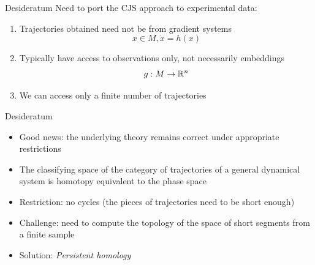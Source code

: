 \documentclass{beamer}
\begin{document}
\begin{frame}{Desideratum}
    Need to port the CJS approach to experimental data:
    \begin{enumerate}
        \item Trajectories obtained need not be from gradient systems
            \[ x \in M, \dot{x} = h(x) \]
            \pause
        \item Typically have access to observations only, not necessarily embeddings
            \[ g : M \rightarrow \mathbb{R}^n \]
            \pause
        \item We can access only a finite number of trajectories
    \end{enumerate}
\end{frame}
\begin{frame}{Desideratum}
    \begin{itemize}
        \item Good news: the underlying theory remains correct under appropriate restrictions
            \pause
        \item The classifying space of the category of trajectories of a general dynamical system
            is homotopy equivalent to the phase space
            \pause
        \item Restriction: no cycles (the pieces of trajectories need to be short enough)
            \pause
        \item Challenge: need to compute the topology of the space of short segments from a finite sample
            \pause
        \item Solution: \textit{Persistent homology}
    \end{itemize}
\end{frame}
\end{document}
